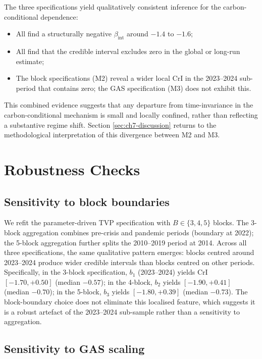 \documentclass[11pt,a4paper]{article}
\newcommand{\bint}{\beta_{\mathrm{int}}}
\begin{document}
The three specifications yield qualitatively consistent inference for the carbon-conditional dependence:
\begin{itemize}
    \item All find a structurally negative $\bint$ around $-1.4$ to $-1.6$;
    \item All find that the credible interval excludes zero in the global or long-run estimate;
    \item The block specifications (M2) reveal a wider local CrI in the 2023--2024 sub-period that contains zero; the GAS specification (M3) does not exhibit this.
\end{itemize}
This combined evidence suggests that any departure from time-invariance in the carbon-conditional mechanism is small and locally confined, rather than reflecting a substantive regime shift. Section \ref{sec:ch7-discussion} returns to the methodological interpretation of this divergence between M2 and M3.

\section{Robustness Checks}
\label{sec:ch7-robust}

\subsection{Sensitivity to block boundaries}
\label{sec:ch7-blocks-robust}

We refit the parameter-driven TVP specification with $B \in \{3, 4, 5\}$ blocks. The 3-block aggregation combines pre-crisis and pandemic periods (boundary at 2022); the 5-block aggregation further splits the 2010--2019 period at 2014. Across all three specifications, the same qualitative pattern emerges: blocks centred around 2023--2024 produce wider credible intervals than blocks centred on other periods. Specifically, in the 3-block specification, $b_1$ (2023--2024) yields CrI $[-1.70, +0.50]$ (median $-0.57$); in the 4-block, $b_2$ yields $[-1.90, +0.41]$ (median $-0.70$); in the 5-block, $b_3$ yields $[-1.80, +0.39]$ (median $-0.73$). The block-boundary choice does not eliminate this localised feature, which suggests it is a robust artefact of the 2023--2024 sub-sample rather than a sensitivity to aggregation.

\subsection{Sensitivity to GAS scaling}
\label{sec:ch7-gas-robust}
\end{document}
